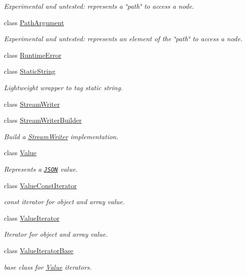 \begin{DoxyCompactItemize}
\begin{DoxyCompactList}\small\item\em Experimental and untested\+: represents a \char`\"{}path\char`\"{} to access a node. \end{DoxyCompactList}\item 
class \hyperlink{classJson_1_1PathArgument}{Path\+Argument}
\begin{DoxyCompactList}\small\item\em Experimental and untested\+: represents an element of the \char`\"{}path\char`\"{} to access a node. \end{DoxyCompactList}\item 
class \hyperlink{classJson_1_1RuntimeError}{Runtime\+Error}
\item 
class \hyperlink{classJson_1_1StaticString}{Static\+String}
\begin{DoxyCompactList}\small\item\em Lightweight wrapper to tag static string. \end{DoxyCompactList}\item 
class \hyperlink{classJson_1_1StreamWriter}{Stream\+Writer}
\item 
class \hyperlink{classJson_1_1StreamWriterBuilder}{Stream\+Writer\+Builder}
\begin{DoxyCompactList}\small\item\em Build a \hyperlink{classJson_1_1StreamWriter}{Stream\+Writer} implementation. \end{DoxyCompactList}\item 
class \hyperlink{classJson_1_1Value}{Value}
\begin{DoxyCompactList}\small\item\em Represents a \href{http://www.json.org}{\tt J\+S\+ON} value. \end{DoxyCompactList}\item 
class \hyperlink{classJson_1_1ValueConstIterator}{Value\+Const\+Iterator}
\begin{DoxyCompactList}\small\item\em const iterator for object and array value. \end{DoxyCompactList}\item 
class \hyperlink{classJson_1_1ValueIterator}{Value\+Iterator}
\begin{DoxyCompactList}\small\item\em Iterator for object and array value. \end{DoxyCompactList}\item 
class \hyperlink{classJson_1_1ValueIteratorBase}{Value\+Iterator\+Base}
\begin{DoxyCompactList}\small\item\em base class for \hyperlink{classJson_1_1Value}{Value} iterators. \end{DoxyCompactList}\end{DoxyCompactItemize}
